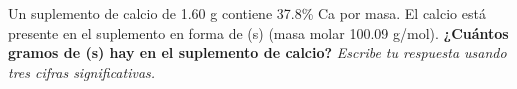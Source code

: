 Un suplemento de calcio de 1.60 g contiene 37.8\% Ca por masa. El calcio está presente en el suplemento en forma de (s) (masa molar 100.09 g/mol).
\textbf{¿Cuántos gramos de (s) hay en el suplemento de calcio?}
\emph{Escribe tu respuesta usando tres cifras significativas.}